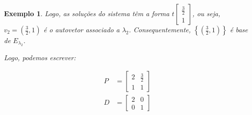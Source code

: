 \documentclass{article}
\newtheorem*{example}{Exemplo}
\begin{document}
\begin{example}
	\par\vspace{0.3cm} Logo, as soluções do sistema têm a forma $t\begin{bmatrix}
	\displaystyle{\frac{3}{2}}\\
	1
	\end{bmatrix}$, ou seja, $v_2 = \left(  \displaystyle{\frac{3}{2}}, 1  \right)$ é o autovetor associado a $\lambda_2$. Consequentemente, $\left\{  \left( \displaystyle{\frac{3}{2}}, 1 \right) \right\}$ é base de $E_{\lambda_2}$.
	
	\par\vspace{0.3cm} Logo, podemos escrever:
	
	\begin{align*}
	P &= \begin{bmatrix}
	2 & \displaystyle{\frac{3}{2}}\\
	1 & 1
	\end{bmatrix} \\
	D &= \begin{bmatrix}
	2 & 0 \\
	0 & 1
	\end{bmatrix}
	\end{align*}
	
\end{example}
\end{document}
